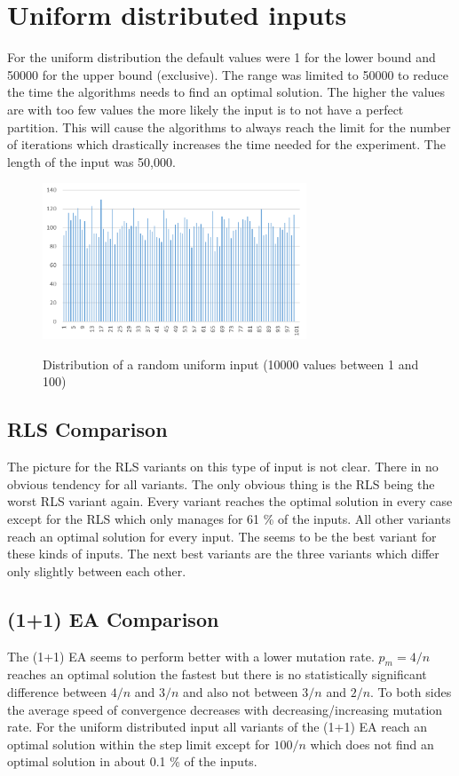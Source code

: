 \section{Uniform distributed inputs}
For the uniform distribution the default values were 1 for the lower bound and 50000 for the upper bound (exclusive).
The range was limited to 50000 to reduce the time the algorithms needs to find an optimal solution.
The higher the values are with too few values the more likely the input is to not have a perfect partition\cite{borgs2001phase}.
This will cause the algorithms to always reach the limit for the number of iterations which drastically increases the time needed for the experiment.
The length of the input was 50,000.


\begin{figure}[h]
      \caption{Distribution of a random uniform input (10000 values between 1 and 100)}
      \centering
      \includegraphics[width=0.7\textwidth]{figures/images/numberGenerator/uniformDistributionMin1Max101n10000.png}\label{fig:uniDistExample}
\end{figure}
\subsection{RLS Comparison}

The picture for the RLS variants on this type of input is not clear.
There in no obvious tendency for all variants.
The only obvious thing is the RLS being the worst RLS variant again.
Every variant reaches the optimal solution in every case except for the RLS which only manages for 61 \% of the inputs.
All other variants reach an optimal solution for every input.
The \RLSN[2] seems to be the best variant for these kinds of inputs.
The next best variants are the three \RLSR[s] variants which differ only slightly between each other.

\subsection{(1+1) EA Comparison}

The (1+1) EA seems to perform better with a lower mutation rate.
$p_m=4/n$ reaches an optimal solution the fastest but there is no statistically significant difference between $4/n$ and $3/n$ and also not between $3/n$ and $2/n$.
To both sides the average speed of convergence decreases with decreasing/increasing mutation rate.
For the uniform distributed input all variants of the (1+1) EA reach an optimal solution within the step limit except for $100/n$ which does not find an optimal solution in about 0.1 \% of the inputs.
